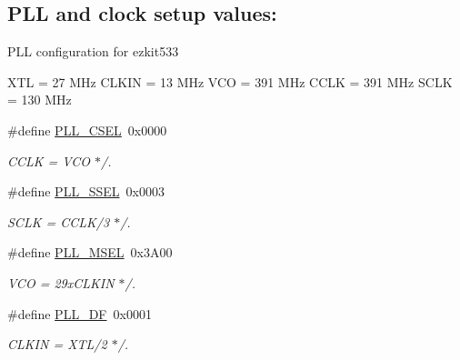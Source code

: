 \subsection*{P\+LL and clock setup values\+:}
\label{_amgrp47f1c699656715f1e2e64e081f5d79f6}%
P\+LL configuration for ezkit533

X\+TL = 27 M\+Hz C\+L\+K\+IN = 13 M\+Hz V\+CO = 391 M\+Hz C\+C\+LK = 391 M\+Hz S\+C\+LK = 130 M\+Hz \begin{DoxyCompactItemize}
\item 
\mbox{\label{group__RTEMSBSPsBfinEZKit533_ga6d4afc313c110ee657fec3799e732cd5}} 
\#define \mbox{\hyperlink{group__RTEMSBSPsBfinEZKit533_ga6d4afc313c110ee657fec3799e732cd5}{P\+L\+L\+\_\+\+C\+S\+EL}}~0x0000
\begin{DoxyCompactList}\small\item\em C\+C\+LK = V\+CO $\ast$/. \end{DoxyCompactList}\item 
\mbox{\label{group__RTEMSBSPsBfinEZKit533_ga4dbfb2ccc698c17868f71a1c11cd18c1}} 
\#define \mbox{\hyperlink{group__RTEMSBSPsBfinEZKit533_ga4dbfb2ccc698c17868f71a1c11cd18c1}{P\+L\+L\+\_\+\+S\+S\+EL}}~0x0003
\begin{DoxyCompactList}\small\item\em S\+C\+LK = C\+C\+L\+K/3 $\ast$/. \end{DoxyCompactList}\item 
\mbox{\label{group__RTEMSBSPsBfinEZKit533_ga55fc96ac6eb8602376d5ded88041c9d3}} 
\#define \mbox{\hyperlink{group__RTEMSBSPsBfinEZKit533_ga55fc96ac6eb8602376d5ded88041c9d3}{P\+L\+L\+\_\+\+M\+S\+EL}}~0x3\+A00
\begin{DoxyCompactList}\small\item\em V\+CO = 29x\+C\+L\+K\+IN $\ast$/. \end{DoxyCompactList}\item 
\mbox{\label{group__RTEMSBSPsBfinEZKit533_ga9a2b8a9935c8e1f75344a7041c2f1566}} 
\#define \mbox{\hyperlink{group__RTEMSBSPsBfinEZKit533_ga9a2b8a9935c8e1f75344a7041c2f1566}{P\+L\+L\+\_\+\+DF}}~0x0001
\begin{DoxyCompactList}\small\item\em C\+L\+K\+IN = X\+T\+L/2 $\ast$/. \end{DoxyCompactList}\item 

\end{DoxyCompactItemize}
